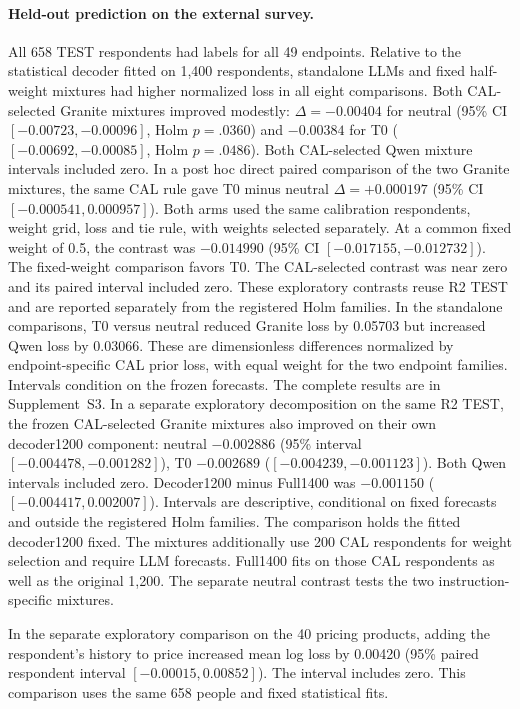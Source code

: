 \documentclass[10pt,twocolumn]{article}
\newcommand{\CurrentApp}{Supplement~S3}
\begin{document}
\paragraph{Held-out prediction on the external survey.}
All 658 TEST respondents had labels for all 49 endpoints. Relative to the
statistical decoder fitted on 1,400 respondents, standalone LLMs and fixed
half-weight mixtures had higher normalized loss in all eight comparisons.
Both CAL-selected Granite mixtures improved modestly: $\Delta=-0.00404$
for neutral (95\% CI $[-0.00723,-0.00096]$, Holm $p=.0360$) and
$-0.00384$ for T0 ($[-0.00692,-0.00085]$, Holm $p=.0486$).
Both CAL-selected Qwen mixture intervals included zero. In a post hoc direct paired
comparison of the two Granite mixtures, the same CAL rule gave
T0 minus neutral $\Delta=+0.000197$ (95\% CI $[-0.000541,0.000957]$).
Both arms used the same calibration respondents, weight grid, loss and
tie rule, with weights selected separately. At a common fixed weight
of 0.5, the contrast was $-0.014990$ (95\% CI $[-0.017155,-0.012732]$).
The fixed-weight comparison favors T0. The CAL-selected contrast was
near zero and its paired interval included zero. These exploratory contrasts reuse R2 TEST
and are reported separately from the registered Holm families. In the standalone comparisons, T0 versus
neutral reduced Granite loss by 0.05703 but increased Qwen loss by 0.03066.
These are dimensionless differences normalized by endpoint-specific CAL
prior loss, with equal weight for the two endpoint families. Intervals
condition on the frozen forecasts. The complete results are in \CurrentApp{}.
In a separate exploratory decomposition on the same R2 TEST, the frozen
CAL-selected Granite mixtures
also improved on their own decoder1200 component: neutral $-0.002886$
(95\% interval $[-0.004478,-0.001282]$), T0 $-0.002689$
($[-0.004239,-0.001123]$). Both Qwen intervals included zero. Decoder1200
minus Full1400 was $-0.001150$ ($[-0.004417,0.002007]$).
Intervals are descriptive, conditional on fixed forecasts and outside
the registered Holm families. The comparison holds the fitted decoder1200
fixed. The mixtures additionally use 200 CAL respondents for weight selection
and require LLM forecasts. Full1400 fits on those CAL respondents as well
as the original 1,200. The separate neutral contrast tests the two
instruction-specific mixtures.


In the separate exploratory comparison on the 40 pricing products,
adding the respondent's history to price increased mean log loss by
0.00420 (95\% paired respondent interval $[-0.00015,0.00852]$).
The interval includes zero. This comparison uses the same 658 people
and fixed statistical fits.
\end{document}
